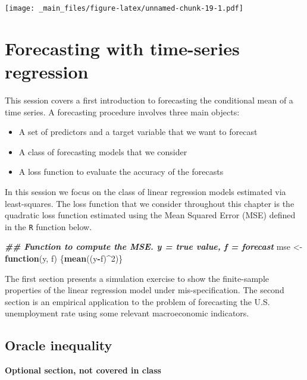 \documentclass[
]{book}
\newenvironment{Shaded}{\begin{snugshade}}{\end{snugshade}}
\newcommand{\ControlFlowTok}[1]{\textcolor[rgb]{0.13,0.29,0.53}{\textbf{#1}}}
\newcommand{\DecValTok}[1]{\textcolor[rgb]{0.00,0.00,0.81}{#1}}
\newcommand{\DocumentationTok}[1]{\textcolor[rgb]{0.56,0.35,0.01}{\textbf{\textit{#1}}}}
\newcommand{\FunctionTok}[1]{\textcolor[rgb]{0.13,0.29,0.53}{\textbf{#1}}}
\newcommand{\NormalTok}[1]{#1}
\newcommand{\OtherTok}[1]{\textcolor[rgb]{0.56,0.35,0.01}{#1}}
\newcommand{\SpecialCharTok}[1]{\textcolor[rgb]{0.81,0.36,0.00}{\textbf{#1}}}
\providecommand{\tightlist}{%
  \setlength{\itemsep}{0pt}\setlength{\parskip}{0pt}}
\begin{document}
\texttt{[image: \_main\_files/figure-latex/unnamed-chunk-19-1.pdf]}

\hypertarget{session02}{%
\chapter{Forecasting with time-series regression}\label{session02}}

This session covers a first introduction to forecasting the conditional mean of a time series. A forecasting procedure involves three main objects:

\begin{itemize}
\tightlist
\item
  A set of predictors and a target variable that we want to forecast
\item
  A class of forecasting models that we consider
\item
  A loss function to evaluate the accuracy of the forecasts
\end{itemize}

In this session we focus on the class of linear regression models estimated via least-squares. The loss function that we consider throughout this chapter is the quadratic loss function estimated using the Mean Squared Error (MSE) defined in the \texttt{R} function below.

\begin{Shaded}
\begin{Highlighting}[]
\DocumentationTok{\#\# Function to compute the MSE. y = true value, f = forecast}
\NormalTok{mse }\OtherTok{\textless{}{-}} \ControlFlowTok{function}\NormalTok{(y, f) \{}\FunctionTok{mean}\NormalTok{((y}\SpecialCharTok{{-}}\NormalTok{f)}\SpecialCharTok{\^{}}\DecValTok{2}\NormalTok{)\}}
\end{Highlighting}
\end{Shaded}

The first section presents a simulation exercise to show the finite-sample properties of the linear regression model under mis-specification. The second section is an empirical application to the problem of forecasting the U.S. unemployment rate using some relevant macroeconomic indicators.

\hypertarget{oracle-inequality}{%
\section{Oracle inequality}\label{oracle-inequality}}

\textbf{Optional section, not covered in class}
\end{document}
